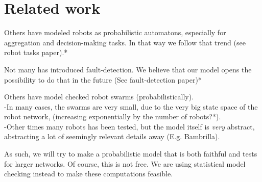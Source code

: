 \section{Related work}


Others have modeled robots as probabilistic automatons, especially for aggregation and decision-making tasks. In that way we follow that trend (see robot tasks paper).*

Not many has introduced fault-detection. We believe that our model opens the possibility to do that in the future (See fault-detection paper)*

Others have model checked robot swarms (probabilistically). \\
-In many cases, the swarms are very small, due to the very big state space of the robot network, (increasing exponentially by the number of robots?*). \\
-Other times many robots has been tested, but the model itself is \textit{very} abstract, abstracting a lot of seemingly relevant details away (E.g. Bambrilla).

As such, we will try to make a probabilistic model that is both faithful and tests for larger networks. Of course, this is not free. We are using statistical model checking instead to make these computations feasible. 


